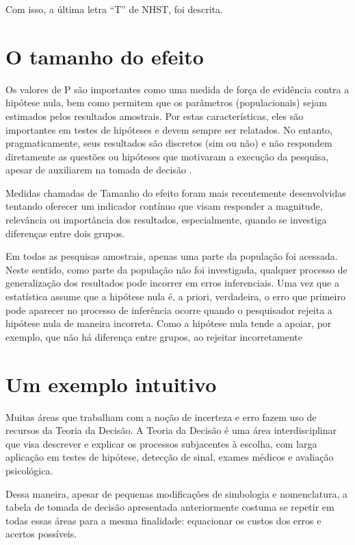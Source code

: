 \documentclass[
]{book}
\begin{document}
Com isso, a última letra ``T'' de NHST, foi descrita.

\hypertarget{o-tamanho-do-efeito}{%
\section{O tamanho do efeito}\label{o-tamanho-do-efeito}}

Os valores de P são importantes como uma medida de força de evidência contra a hipótese nula, bem como permitem que os parâmetros (populacionais) sejam estimados pelos resultados amostrais. Por estas características, eles são importantes em testes de hipóteses e devem sempre ser relatados. No entanto, pragmaticamente, seus resultados são discretos (sim ou não) e não respondem diretamente as questões ou hipóteses que motivaram a execução da pesquisa, apesar de auxiliarem na tomada de decisão \citep{Goodman1999}.

Medidas chamadas de Tamanho do efeito foram mais recentemente desenvolvidas tentando oferecer um indicador contínuo que visam responder a magnitude, relevância ou importância dos resultados, especialmente, quando se investiga diferenças entre dois grupos.

Em todas as pesquisas amostrais, apenas uma parte da população foi acessada. Neste sentido, como parte da população não foi investigada, qualquer processo de generalização dos resultados pode incorrer em erros inferenciais. Uma vez que a estatística assume que a hipótese nula é, a priori, verdadeira, o erro que primeiro pode aparecer no processo de inferência ocorre quando o pesquisador rejeita a hipótese nula de maneira incorreta. Como a hipótese nula tende a apoiar, por exemplo, que não há diferença entre grupos, ao rejeitar incorretamente

\hypertarget{um-exemplo-intuitivo}{%
\section{Um exemplo intuitivo}\label{um-exemplo-intuitivo}}

Muitas áreas que trabalham com a noção de incerteza e erro fazem uso de recursos da Teoria da Decisão. A Teoria da Decisão é uma área interdisciplinar que visa descrever e explicar os processos subjacentes à escolha, com larga aplicação em testes de hipótese, detecção de sinal, exames médicos e avaliação psicológica.

Dessa maneira, apesar de pequenas modificações de simbologia e nomenclatura, a tabela de tomada de decisão apresentada anteriormente costuma se repetir em todas essas áreas para a mesma finalidade: equacionar os custos dos erros e acertos possíveis.
\end{document}
